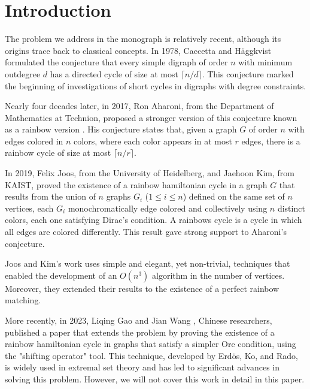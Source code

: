 
\chapter{Introduction}

The problem we address in the monograph is relatively recent, although its origins trace back to classical concepts. 
In 1978, Caccetta and Häggkvist \cite{nathanson2006caccettahaggkvistconjectureadditivenumber} formulated the conjecture 
that every simple digraph of order $n$ with minimum outdegree $d$ 
has a directed cycle of size at most $\lceil n/d \rceil$. This conjecture marked the beginning of investigations 
of short cycles in digraphs with degree constraints.

Nearly four decades later, in 2017, Ron Aharoni, from the Department of Mathematics at Technion, proposed a stronger 
version of this conjecture known as a rainbow version \cite{AharonisConjecture}. His conjecture states that, given a graph $G$ of order $n$ 
with edges colored in $n$ colors, where each color appears in at most $r$ edges, there is a rainbow cycle of size 
at most $\lceil n/r \rceil$.

In 2019, Felix Joos, from the University of Heidelberg, and Jaehoon Kim, from KAIST, 
proved the existence of a rainbow hamiltonian cycle in a graph $G$ that results from the union of $n$ graphs
$G_i$ ($1 \leq i \leq n$) defined on the same set of $n$ vertices, each $G_i$ monochromatically edge colored
and collectively using $n$ distinct colors, each one satisfying Dirac's condition. A rainbows cycle is a cycle 
in which all edges are colored differently. This result gave strong support to Aharoni's conjecture.

Joos and Kim's work uses simple and elegant, yet non-trivial, techniques that enabled the development of an $O(n^3)$ 
algorithm in the number of vertices. Moreover, they extended their results to the existence of a perfect rainbow 
matching.

More recently, in 2023, Liqing Gao and Jian Wang \cite{gao_wang_2024}, Chinese researchers, published a paper that extends the problem 
by proving the existence of a rainbow hamiltonian cycle in graphs that satisfy a simpler Ore condition, using the 
"shifting operator" tool. This technique, developed by Erdös, Ko, and Rado, is widely used in extremal set theory 
and has led to significant advances in solving this problem. However, we will not cover this work in detail in 
this paper.

